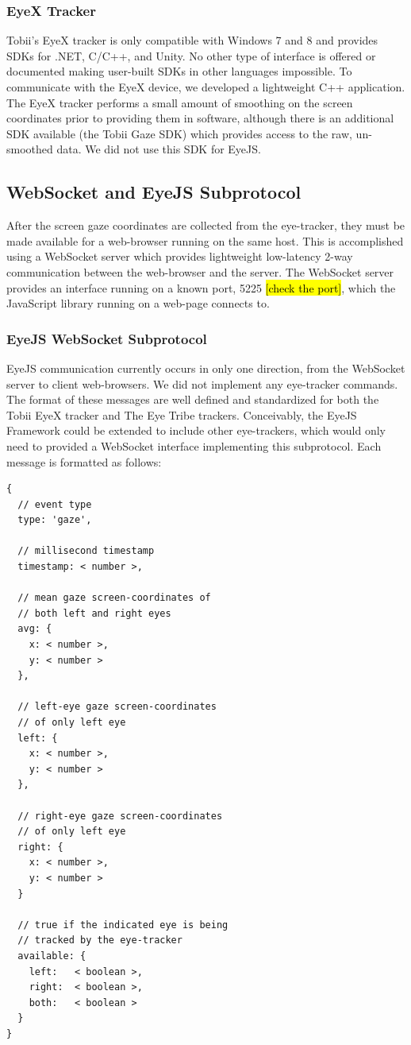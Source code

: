 \documentclass{sigchi}
\begin{document}
\subsubsection{EyeX Tracker}
Tobii's EyeX tracker is only compatible with Windows 7 and 8 and provides SDKs for .NET, C/C++, and Unity. No other type of interface is offered or documented making user-built SDKs in other languages impossible. To communicate with the EyeX device, we developed a lightweight C++ application. The EyeX tracker performs a small amount of smoothing on the screen coordinates prior to providing them in software, although there is an additional SDK available (the Tobii Gaze SDK) which provides access to the raw, un-smoothed data. We did not use this SDK for EyeJS.


\subsection{WebSocket and EyeJS Subprotocol}
After the screen gaze coordinates are collected from the eye-tracker, they must be made available for a web-browser running on the same host. This is accomplished using a WebSocket server which provides lightweight low-latency 2-way communication between the web-browser and the server. The WebSocket server provides an interface running on a known port, 5225 \hl{[check the port]}, which the JavaScript library running on a web-page connects to.

\subsubsection{EyeJS WebSocket Subprotocol}
EyeJS communication currently occurs in only one direction, from the WebSocket server to client web-browsers. We did not implement any eye-tracker commands. The format of these messages are well defined and standardized for both the Tobii EyeX tracker and The Eye Tribe trackers. Conceivably, the EyeJS Framework could be extended to include other eye-trackers, which would only need to provided a WebSocket interface implementing this subprotocol. Each message is formatted as follows:

\begin{lstlisting}
{
  // event type
  type: 'gaze',

  // millisecond timestamp
  timestamp: < number >,

  // mean gaze screen-coordinates of
  // both left and right eyes
  avg: {
    x: < number >,
    y: < number >
  },

  // left-eye gaze screen-coordinates
  // of only left eye
  left: {
    x: < number >,
    y: < number >
  },

  // right-eye gaze screen-coordinates
  // of only left eye
  right: {
    x: < number >,
    y: < number >
  }

  // true if the indicated eye is being
  // tracked by the eye-tracker
  available: {
    left:   < boolean >,
    right:  < boolean >,
    both:   < boolean >
  }
}
\end{lstlisting}
\end{document}

